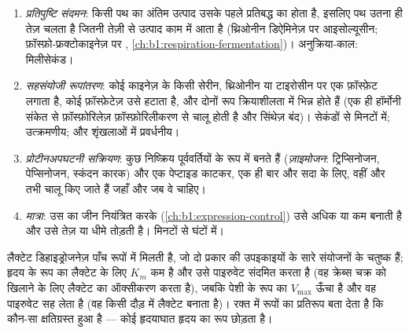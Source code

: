 \begin{proposition}[कोशिका किसी एंजाइम को नियंत्रित करने के चार ढंग]\label{prop:b1:enzymes:control}
\begin{enumerate}
  \item \emph{प्रतिपुष्टि संदमन}: किसी पथ का
        अंतिम उत्पाद उसके पहले प्रतिबद्ध  का  
        होता है, इसलिए पथ उतना ही तेज़ चलता है जितनी तेज़ी से उत्पाद
        काम में आता है (थ्रिओनीन डिऐमिनेज़ पर आइसोल्यूसीन; फ़ॉस्फ़ो-फ्रक्टोकाइनेज़
        पर , \cref{ch:b1:respiration-fermentation})।
        अनुक्रिया-काल: मिलीसेकंड।
  \item \emph{सहसंयोजी रूपांतरण}:
        कोई काइनेज़  के किसी सेरीन, थ्रिओनीन या टाइरोसीन पर एक
        फ़ॉस्फ़ेट लगाता है, कोई फ़ॉस्फ़ेटेज़ उसे हटाता है, और दोनों रूप
        क्रियाशीलता में भिन्न होते हैं (एक ही हॉर्मोनी संकेत से 
        फ़ॉस्फ़ोरिलेज़ फ़ॉस्फ़ोरिलीकरण से चालू होती है और 
        सिंथेज़ बंद)। सेकंडों से मिनटों में; उत्क्रमणीय; और शृंखलाओं में
        प्रवर्धनीय।
  \item \emph{प्रोटीनअपघटनी सक्रियण}: कुछ  निष्क्रिय पूर्ववर्तियों
        के रूप में बनते हैं (\emph{ज़ाइमोजन}: ट्रिप्सिनोजन,
        पेप्सिनोजन, स्कंदन कारक) और एक पेप्टाइड काटकर, एक ही बार और सदा
        के लिए, वहीं और तभी चालू किए जाते हैं जहाँ और जब वे चाहिए।
  \item \emph{मात्रा}:  उस  का जीन नियंत्रित करके
        (\cref{ch:b1:expression-control}) उसे अधिक या कम बनाती है और
        उसे तेज़ या धीमे तोड़ती है। मिनटों से घंटों में।
\end{enumerate}
\end{proposition}

\begin{example}[सम-एंजाइम]\label{ex:b1:enzymes:isoenzymes}
लैक्टेट डिहाइड्रोजनेज़ पाँच रूपों में मिलती है, जो दो प्रकार की
उपइकाइयों के सारे संयोजनों के चतुष्क हैं; हृदय के रूप का लैक्टेट के लिए
$K_m$ कम है और उसे पाइरुवेट संदमित करता है (वह क्रेब्स चक्र को खिलाने के
लिए लैक्टेट का ऑक्सीकरण करता है), जबकि पेशी के रूप का $V_{\max}$ ऊँचा है
और वह पाइरुवेट सह लेता है (वह किसी दौड़ में लैक्टेट बनाता है)। रक्त में
रूपों का प्रतिरूप बता देता है कि कौन-सा  क्षतिग्रस्त हुआ है --- कोई
हृदयाघात हृदय का रूप छोड़ता है।
\end{example}

